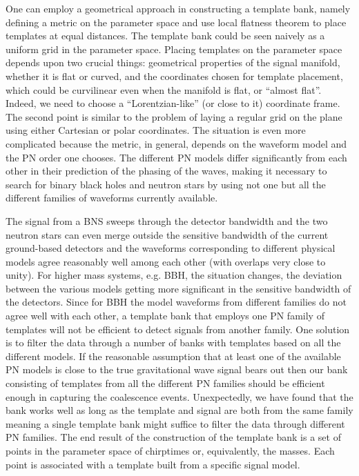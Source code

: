 \documentclass[binding=0.6cm, LaM]{sapthesis}
\begin{document}
	One can employ a geometrical approach in constructing a template bank, 
	namely defining a metric on the parameter space and use local flatness theorem 
	to place templates at equal distances. 
	The template bank could be seen naively as a uniform grid in the parameter space. 
	Placing templates on the parameter space depends upon two crucial things: 
	geometrical properties of the signal manifold, whether it is flat or curved, 
	and the coordinates chosen for template placement, 
	which could be curvilinear even when the manifold is flat, or “almost flat”. 
	Indeed, we need to choose a “Lorentzian-like” (or close to it) coordinate frame. 
	The second point is similar to the problem of laying a regular grid on the plane using either Cartesian or polar coordinates. 
	The situation is even more complicated because the metric, 
	in general, depends on the waveform model and the PN order one chooses. 
	The different PN models differ significantly from each other in their prediction of the phasing of the waves, 
	making it necessary to search for binary black holes and neutron stars 
	by using not one but all the different families of waveforms currently available. 
	
	The signal from a BNS sweeps through the detector bandwidth and 
	the two neutron stars can even merge outside the sensitive bandwidth of the current ground-based detectors 	
	and the waveforms corresponding to different physical models agree reasonably well among each other 
	(with overlaps very close to unity). 
	For higher mass systems, e.g. BBH, the situation changes, 
	the deviation between the various models getting more significant in the sensitive bandwidth of the detectors. 
	Since for BBH the model waveforms from different families do not agree well with each other, 
	a template bank that employs one PN family of templates will not be efficient to detect signals from another family. 
	One solution is to filter the data through a number of banks with templates based on all the different models. 
	If the reasonable assumption that at least one of the available PN models 
	is close to the true gravitational wave signal bears out then our bank 
	consisting of templates from all the different PN families 
	should be efficient enough in capturing the coalescence events. 
	Unexpectedly, we have found that the bank works well as long as the template and signal 
	are both from the same family meaning a single template bank might suffice 
	to filter the data through different PN families. 
	The end result of the construction of the template bank is a set of points in the parameter space 	
	of chirptimes or, equivalently, the masses. 
	Each point is associated with a template built from a specific signal model. 
\end{document}

